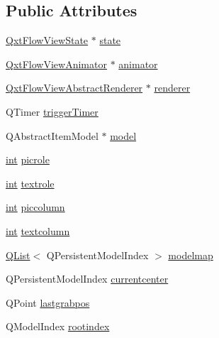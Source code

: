 \subsection*{Public Attributes}
\begin{DoxyCompactItemize}
\item 
\hyperlink{class_qxt_flow_view_state}{Qxt\-Flow\-View\-State} $\ast$ \hyperlink{class_qxt_flow_view_private_aa416bb9a3d10c7f318d1a33e5df3ca72}{state}
\item 
\hyperlink{class_qxt_flow_view_animator}{Qxt\-Flow\-View\-Animator} $\ast$ \hyperlink{class_qxt_flow_view_private_aadb557ae9a7eabda3d0e0c6181b5982b}{animator}
\item 
\hyperlink{class_qxt_flow_view_abstract_renderer}{Qxt\-Flow\-View\-Abstract\-Renderer} $\ast$ \hyperlink{class_qxt_flow_view_private_ad3a1c99bc649eb596cd4d1a5749a8091}{renderer}
\item 
Q\-Timer \hyperlink{class_qxt_flow_view_private_a94acb927e32ce075031ac1305e615464}{trigger\-Timer}
\item 
Q\-Abstract\-Item\-Model $\ast$ \hyperlink{class_qxt_flow_view_private_ab87088917a257e0d72f091cff5031b9c}{model}
\item 
\hyperlink{ioapi_8h_a787fa3cf048117ba7123753c1e74fcd6}{int} \hyperlink{class_qxt_flow_view_private_a9d7a7654e4f1f24aaca5c9ab0587e795}{picrole}
\item 
\hyperlink{ioapi_8h_a787fa3cf048117ba7123753c1e74fcd6}{int} \hyperlink{class_qxt_flow_view_private_a4c784cdb155f95f3ae6afa2bb38dda21}{textrole}
\item 
\hyperlink{ioapi_8h_a787fa3cf048117ba7123753c1e74fcd6}{int} \hyperlink{class_qxt_flow_view_private_a9ab798b08582230e8d456fc65c6f00e6}{piccolumn}
\item 
\hyperlink{ioapi_8h_a787fa3cf048117ba7123753c1e74fcd6}{int} \hyperlink{class_qxt_flow_view_private_ab937d911c41ef46ad31c4305b751cb4a}{textcolumn}
\item 
\hyperlink{class_q_list}{Q\-List}$<$ Q\-Persistent\-Model\-Index $>$ \hyperlink{class_qxt_flow_view_private_a747c83c6a43f0c724a3537f10496caf0}{modelmap}
\item 
Q\-Persistent\-Model\-Index \hyperlink{class_qxt_flow_view_private_a51b8b502baa6b1fd0431f78a94ce17aa}{currentcenter}
\item 
Q\-Point \hyperlink{class_qxt_flow_view_private_a7437764980c38acac02c612c1b0789c4}{lastgrabpos}
\item 
Q\-Model\-Index \hyperlink{class_qxt_flow_view_private_aaa70aeb770c8f206da9c546cba1e32fd}{rootindex}
\end{DoxyCompactItemize}



